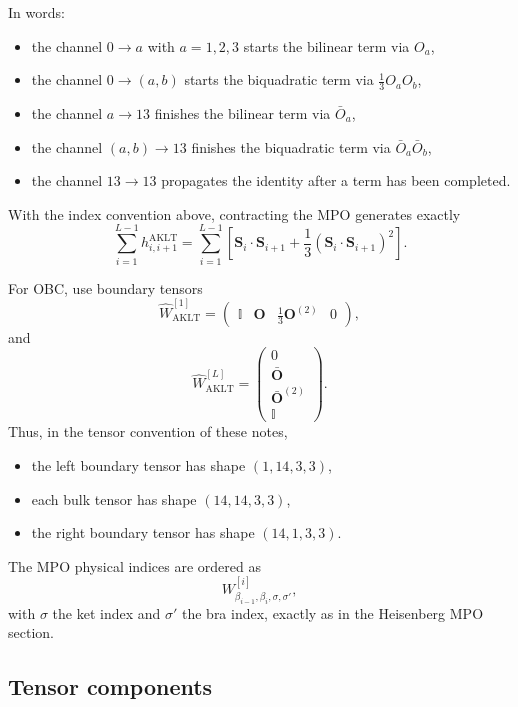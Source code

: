 \documentclass[aps,prb,onecolumn,nofootinbib]{revtex4-2}
\newcommand{\Id}{\mathbb{I}}
\begin{document}
	In words:
	\begin{itemize}
		\item the channel $0\to a$ with $a=1,2,3$ starts the bilinear term via $O_a$,
		\item the channel $0\to(a,b)$ starts the biquadratic term via $\frac13 O_a O_b$,
		\item the channel $a\to 13$ finishes the bilinear term via $\bar O_a$,
		\item the channel $(a,b)\to 13$ finishes the biquadratic term via $\bar O_a \bar O_b$,
		\item the channel $13\to 13$ propagates the identity after a term has been completed.
	\end{itemize}
	With the index convention above, contracting the MPO generates exactly
	\[
	\sum_{i=1}^{L-1} h_{i,i+1}^{\mathrm{AKLT}}
	=
	\sum_{i=1}^{L-1}
	\left[
	\mathbf S_i\cdot \mathbf S_{i+1}
	+
	\frac13\left(\mathbf S_i\cdot \mathbf S_{i+1}\right)^2
	\right].
	\]
	
	For OBC, use boundary tensors
	\begin{equation}
		\hat W_{\mathrm{AKLT}}^{[1]}
		=
		\begin{pmatrix}
			\Id & \bm O & \frac13 \bm O^{(2)} & 0
		\end{pmatrix},
		\label{eq:aklt-left-boundary}
	\end{equation}
	and
	\begin{equation}
		\hat W_{\mathrm{AKLT}}^{[L]}
		=
		\begin{pmatrix}
			0 \\ \bar{\bm O} \\ \bar{\bm O}^{(2)} \\ \Id
		\end{pmatrix}.
		\label{eq:aklt-right-boundary}
	\end{equation}
	Thus, in the tensor convention of these notes,
	\begin{itemize}
		\item the left boundary tensor has shape $(1,14,3,3)$,
		\item each bulk tensor has shape $(14,14,3,3)$,
		\item the right boundary tensor has shape $(14,1,3,3)$.
	\end{itemize}
	The MPO physical indices are ordered as
	\[
	W^{[i]}_{\beta_{i-1},\beta_i,\sigma,\sigma'},
	\]
	with $\sigma$ the ket index and $\sigma'$ the bra index, exactly as in the Heisenberg MPO section.
	
	\subsection{Tensor components}
	
\end{document}
